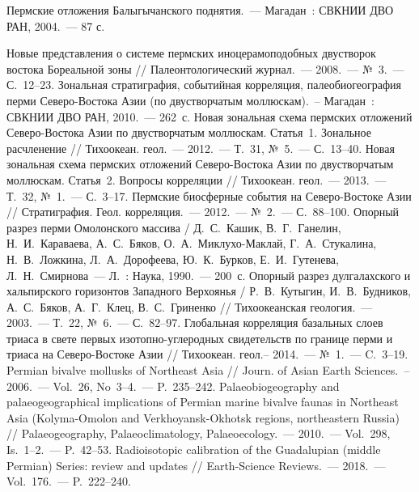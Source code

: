 \begin{thebibliography}{99}
\bibitem{} Пермские отложения Балыгычанского поднятия.~--- Магадан~: СВКНИИ ДВО РАН, 2004.~--- 87 с.

\bibitem{} Новые представления о системе пермских иноцерамоподобных двустворок востока Бореальной зоны // Палеонтологический журнал.~--- 2008.~---  №~3.~--- С.~12--23.
\bibitem{} Зональная стратиграфия, событийная корреляция, палеобиогеография перми Северо-Востока Азии (по двустворчатым моллюскам).~-- Магадан~: СВКНИИ ДВО РАН, 2010.~--- 262~с.
\bibitem{} Новая зональная схема пермских отложений Северо-Востока Азии по двустворчатым моллюскам. Статья~1. Зональное расчленение // Тихоокеан. геол.~---  2012.~--- Т.~31, №~5.~--- С.~13--40.
\bibitem{} Новая зональная схема пермских отложений Северо-Востока Азии по двустворчатым моллюскам. Статья~2. Вопросы корреляции // Тихоокеан. геол.~---  2013.~---  Т.~32, №~1.~--- С.~3--17.
\bibitem{} Пермские биосферные события на Северо-Востоке Азии // Стратиграфия. Геол. корреляция.~---  2012.~---  №~2.~---  С.~88--100.
\bibitem{} Опорный разрез перми Омолонского массива / Д.~С.~Кашик, В.~Г.~Ганелин, Н.~И.~Караваева, А.~С.~Бяков, О.~А.~Миклухо-Маклай, Г.~А.~Стукалина, Н.~В.~Ложкина, Л.~А.~Дорофеева, Ю.~К.~Бурков, Е.~И.~Гутенева, Л.~Н.~Смирнова~--- Л.~: Наука, 1990.~---  200~с.
\bibitem{} Опорный разрез дулгалахского и хальпирского горизонтов Западного Верхоянья / Р.~В.~Кутыгин, И.~В.~Будников, А.~С.~Бяков, А.~Г.~Клец, В.~С.~Гриненко // Тихоокеанская геология.~---  2003.~---  Т.~22, №~6.~---  С.~82--97.
\bibitem{} Глобальная корреляция базальных слоев триаса в свете первых изотопно-углеродных свидетельств по границе перми и триаса на Северо-Востоке Азии // Тихоокеан. геол.­--  2014.~---  №~1.~---  C.~3--19.
\bibitem{} Permian bivalve mollusks of Northeast Asia // Journ. of Asian Earth Sciences. -- 2006.~--- Vol.~26, No~3--4.~--- P.~235--242.
\bibitem{} Palaeobiogeography and palaeogeographical implications of Permian marine bivalve faunas in Northeast Asia (Kolyma-Omolon and Verkhoyansk-Okhotsk regions, northeastern Russia) // Palaeogeography, Palaeoclimatology, Palaeoecology.~--- 2010.~--- Vol.~298, Is.~1--2.~--- P.~42--53.
\bibitem{} Radioisotopic calibration of the Guadalupian (middle Permian) Series: review and updates // Earth-Science Reviews.~--- 2018.~--- Vol.~176.~--- P.~222--240.

\end{thebibliography}
